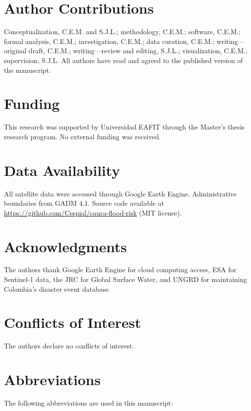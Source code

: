 \documentclass{article}
\begin{document}
\section*{Author Contributions}

Conceptualization, C.E.M. and S.J.L.; methodology, C.E.M.; software, C.E.M.; formal analysis, C.E.M.; investigation, C.E.M.; data curation, C.E.M.; writing---original draft, C.E.M.; writing---review and editing, S.J.L.; visualization, C.E.M.; supervision, S.J.L. All authors have read and agreed to the published version of the manuscript.

\section*{Funding}

This research was supported by Universidad EAFIT through the Master's thesis research program. No external funding was received.

\section*{Data Availability}

All satellite data were accessed through Google Earth Engine. Administrative boundaries from GADM 4.1. Source code available at \url{https://github.com/Cespial/cauca-flood-risk} (MIT license).

\section*{Acknowledgments}

The authors thank Google Earth Engine for cloud computing access, ESA for Sentinel-1 data, the JRC for Global Surface Water, and UNGRD for maintaining Colombia's disaster event database.

\section*{Conflicts of Interest}

The authors declare no conflicts of interest.

\section*{Abbreviations}

The following abbreviations are used in this manuscript:\\
\end{document}
